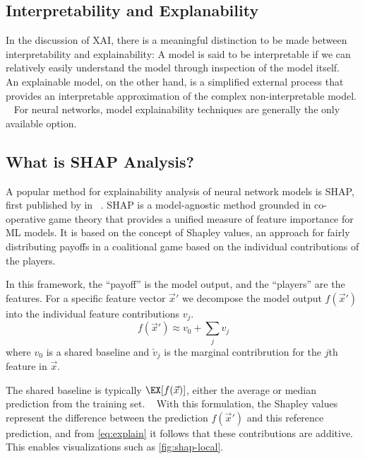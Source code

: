 \subsection{Interpretability and Explanability}

In the discussion of \ac{XAI}, there is 
a meaningful distinction to be made between 
interpretability and explainability:
A model is said to be interpretable if we can 
relatively easily understand the model through inspection
of the model itself.
~\autocite{russellArtificial2009}
An explainable model, on the other hand, is a simplified 
external process that provides an interpretable approximation
of the complex non-interpretable model.
~\autocite{lundbergUnified2017}
For neural networks,
model explainability techniques are generally 
the only available option.

\subsection{What is SHAP Analysis?} 

A popular method for explainability analysis of neural network models
is \ac{SHAP}, first published by
\citeauthor{lundbergUnified2017} in \citeyear{lundbergUnified2017}
~\autocite{lundbergUnified2017}.
SHAP is a model-agnostic method grounded in co-operative game theory
that provides a unified measure of feature importance for \ac{ML} models.
It is based on the concept of Shapley values,  
an approach for fairly distributing payoffs in a coalitional game
based on the individual contributions of the players.
~\autocite{shapley1953value}

In this framework, 
the \enquote{payoff} is the model output, 
and the \enquote{players} are the features.
For a specific feature vector 
\(\vec{x}'\) 
we decompose the model output \(f(\vec{x}')\)
into the individual feature contributions \(v_{j}\).
~\autocite{aasExplaining2020}
\begin{equation}
    \label{eq:explain}
    f(\vec{x}') \approx v_0 + \sum_{j} v_{j}
\end{equation}
where \(v_0\) is a shared baseline and 
\(\check{v}_{j}\) is the marginal contribrution for the \(j\)th 
feature in \( \vec{x}\).

The shared baseline is typically \(\EX[f(\vec{x})]\), 
either the average or median prediction from the training set.
~\autocite{aasExplaining2020}
With this formulation, the Shapley values represent the difference between
the prediction \(f(\vec{x}')\) and this reference prediction,
and from \cref{eq:explain} it follows that these contributions are additive.
~\autocite{aasExplaining2020}
This enables visualizations such as \cref{fig:shap-local}.

